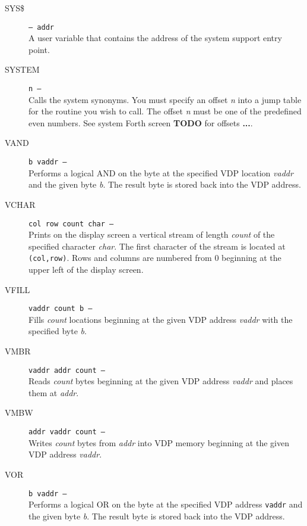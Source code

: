 \documentclass{article}
\begin{document}
\begin{multicols}{2}[]
\begin{description}
			\item[SYS\$]\texttt{--- addr }\\
				A user variable that contains the address of the system support entry point.

			\item[SYSTEM]\texttt{n --- }\\
				Calls the system synonyms. You must specify an offset \textit{n} into
				a jump table for the routine you wish to call. The offset \textit{n}
				must be one of the predefined even numbers. See system Forth screen 
				\textbf{TODO} for offsets \textbf{...}.

			\item[VAND]\texttt{b vaddr --- }\\
				Performs a logical AND on the byte at the specified VDP location
				\textit{vaddr} and the given byte \textit{b}. The result byte is
				stored back into the VDP address.

			\item[VCHAR]\texttt{col row count char --- }\\
				Prints on the display screen a vertical stream of length \textit{count}
				of the specified character \textit{char}. The first character of the
				stream is located at \verb|(col,row)|. Rows and columns are numbered
				from 0 beginning at the upper left of the display screen.

			\item[VFILL]\texttt{vaddr count b --- }\\
				Fills \textit{count} locations beginning at the given VDP address
				\textit{vaddr} with the specified byte \textit{b}.

			\item[VMBR]\texttt{vaddr addr count --- }\\
				Reads \textit{count} bytes beginning at the given VDP address
				\textit{vaddr} and places them at \textit{addr}.

			\item[VMBW]\texttt{addr vaddr count --- }\\
				Writes \textit{count} bytes from \textit{addr} into VDP memory
				beginning at the given VDP address \textit{vaddr}.

			\item[VOR]\texttt{b vaddr --- }\\
				Performs a logical OR on the byte at the specified VDP address
				\verb|vaddr| and the given byte \textit{b}. The result byte is stored
				back into the VDP address.


\end{description}
\end{multicols}
\end{document}
